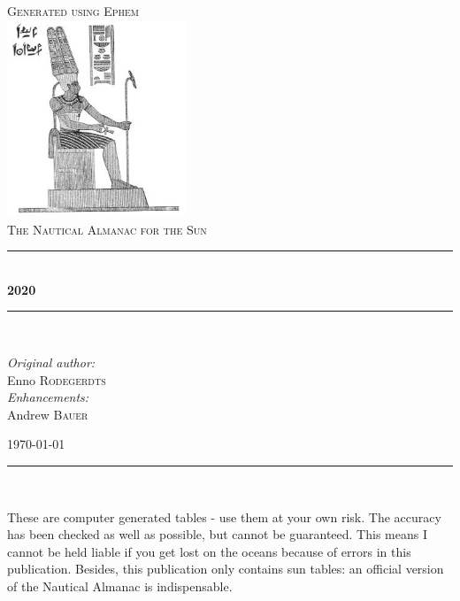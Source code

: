 \documentclass[10pt, a4paper]{report}
\newcommand{\HRule}{\rule{\linewidth}{0.5mm}}
\begin{document}
\begin{titlepage}
    \vspace*{2cm}
    \begin{center}
    \textsc{\Large Generated using Ephem}\\[1.5cm]
    \includegraphics[width=0.4\textwidth]{./Ra}\\[1cm]
    \textsc{\huge The Nautical Almanac for the Sun}\\[0.7cm]
    \HRule \\[0.6cm]
    { \Huge \bfseries 2020}\\[0.4cm]
    \HRule \\[1.5cm]
    \begin{center} \large
    \emph{Original author:}\\
    Enno \textsc{Rodegerdts}\\[6Pt]
    \emph{Enhancements:}\\
    Andrew \textsc{Bauer}    
    \end{center}
    \vfill
    {\large \today}
    \HRule \\[0.6cm]
    \end{center}
    \begin{description}\footnotesize
    \item[Disclaimer:] These are computer generated tables - use them at your own risk.
    The accuracy has been checked as well as possible, but cannot be guaranteed.
    This means I cannot be held liable if you get lost on the oceans because of errors in this publication.
    Besides, this publication only contains sun tables: an official version of the Nautical Almanac is indispensable.
    \end{description}
\end{titlepage}
\end{document}
